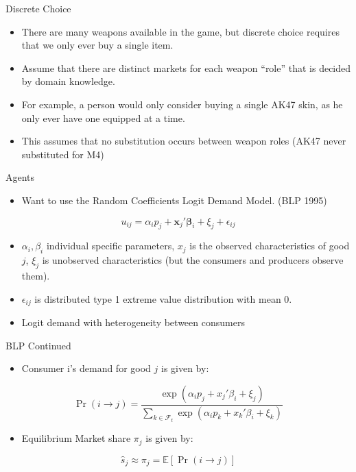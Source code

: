 \documentclass[bigger]{beamer}
\newcommand{\exV}[1]{\mathbb{E} \left [ #1 \right ]}
\begin{document}
\begin{frame}[label={sec:orgdb81201}]{Discrete Choice}
\begin{itemize}
\item There are many weapons available in the game, but discrete choice
requires that we only ever buy a single item.
\item Assume that there are distinct markets for each weapon ``role'' that
is decided by domain knowledge.
\item For example, a person would only consider buying a single AK47 skin,
as he only ever have one equipped at a time.
\item This assumes that no substitution occurs between weapon roles
(AK47 never substituted for M4)
\end{itemize}
\end{frame}

\begin{frame}[label={sec:orgc92794d}]{Agents}
\begin{itemize}
\item Want to use the Random Coefficients Logit Demand Model. (BLP 1995)
\end{itemize}

\begin{equation*}
  u_{ij} = \alpha_i p_j + \bm{x}_j' \bm{\beta}_i + \xi_j + \epsilon_{ij}
\end{equation*}
\begin{itemize}
\item \(\alpha_i, \beta_i\) individual specific parameters, \(x_j\) is the observed
characteristics of good \(j\), \(\xi_j\) is unobserved characteristics (but
the consumers and producers observe them).
\item \(\epsilon_{ij}\) is distributed type 1 extreme value distribution with mean \(0\).
\item Logit demand with heterogeneity between consumers
\end{itemize}
\end{frame}

\begin{frame}[label={sec:orgbe76693}]{BLP Continued}
\begin{itemize}
\item Consumer i's demand for good \(j\) is given by:
\end{itemize}

\begin{equation*}
  \Pr( i \rightarrow j ) = \frac{\exp( \alpha_i p_j + x_j' \beta_i + \xi_j)}{\sum_{k \in
      \mathcal{F}_t} \exp( \alpha_i p_k + x_k' \beta_i + \xi_k)}
\end{equation*}

\begin{itemize}
\item Equilibrium Market share \(\pi_j\) is given by:
\end{itemize}
\begin{equation*}
  \hat{s}_j \approx \pi_j = \exV{ \Pr( i \rightarrow j )}
\end{equation*}
\end{frame}
\end{document}

